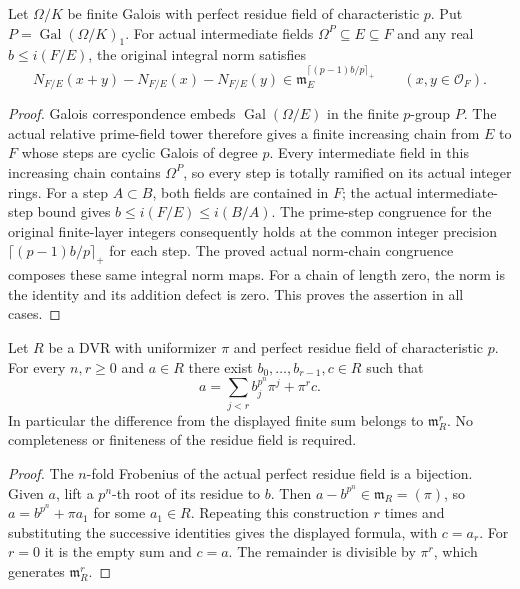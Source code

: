 \begin{lemma}
\label{fw:actual-wild-field-norm-congruence}
\leanok
Let $\Omega/K$ be finite Galois with perfect residue field of
characteristic $p$. Put $P=\operatorname{Gal}(\Omega/K)_1$.
For actual intermediate fields $\Omega^P\subseteq E\subseteq F$
and any real $b\leq i(F/E)$, the original integral norm satisfies
\[
 N_{F/E}(x+y)-N_{F/E}(x)-N_{F/E}(y)
 \in\mathfrak m_E^{\lceil(p-1)b/p\rceil_+}
 \qquad(x,y\in\mathcal O_F).
\]
\end{lemma}
\begin{proof}
Galois correspondence embeds $\operatorname{Gal}(\Omega/E)$
in the finite $p$-group $P$. The actual relative prime-field tower
therefore gives a finite increasing chain from $E$ to $F$ whose
steps are cyclic Galois of degree $p$. Every intermediate field
in this increasing chain contains $\Omega^P$, so every step is
totally ramified on its actual integer rings. For a step
$A\subset B$, both fields are contained in $F$; the actual
intermediate-step bound gives
$b\leq i(F/E)\leq i(B/A)$. The prime-step congruence for the
original finite-layer integers consequently holds at the common
integer precision $\lceil(p-1)b/p\rceil_+$ for each step.
The proved actual norm-chain congruence composes these same
integral norm maps. For a chain of length zero, the norm is the
identity and its addition defect is zero. This proves the
assertion in all cases.
\end{proof}

\begin{lemma}
\label{fw:finite-perfect-residue-digits}
\leanok
Let $R$ be a DVR with uniformizer $\pi$ and perfect residue field
of characteristic $p$. For every $n,r\geq0$ and $a\in R$ there
exist $b_0,\ldots,b_{r-1},c\in R$ such that
\[
 a=\sum_{j<r}b_j^{p^n}\pi^j+\pi^r c.
\]
In particular the difference from the displayed finite sum belongs
to $\mathfrak m_R^r$. No completeness or finiteness of the residue
field is required.
\end{lemma}
\begin{proof}
The $n$-fold Frobenius of the actual perfect residue field is a
bijection. Given $a$, lift a $p^n$-th root of its residue to $b$.
Then $a-b^{p^n}\in\mathfrak m_R=(\pi)$, so
$a=b^{p^n}+\pi a_1$ for some $a_1\in R$. Repeating this
construction $r$ times and substituting the successive identities
gives the displayed formula, with $c=a_r$. For $r=0$ it is the
empty sum and $c=a$. The remainder is divisible by $\pi^r$,
which generates $\mathfrak m_R^r$.
\end{proof}

